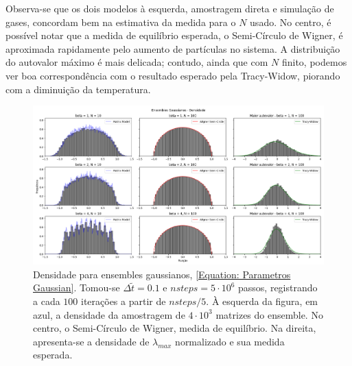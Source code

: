 \documentclass[12pt]{report}
\begin{document}
Observa-se que os dois modelos à esquerda, amostragem direta e simulação de gases, concordam bem na estimativa da medida para o $N$ usado. No centro, é possível notar que a medida de equilíbrio esperada, o Semi-Círculo de Wigner, é aproximada rapidamente pelo aumento de partículas no sistema. A distribuição do autovalor máximo é mais delicada; contudo, ainda que com $N$ finito, podemos ver boa correspondência com o resultado esperado pela Tracy-Widow, piorando com a diminuição da temperatura.
\begin{figure}[ht!]
	\centering
	\includegraphics[width=\textwidth]{Assets/validationGaussianTracy.png}
	\caption{Densidade para ensembles gaussianos, \eqref{Equation: Parametros Gaussian}. Tomou-se $\Delta \tilde{t} = 0.1$ e $nsteps = 5\cdot10^6$ passos, registrando a cada $100$ iterações a partir de $nsteps/5$. À esquerda da figura, em azul, a densidade da amostragem de $4\cdot10^3$ matrizes do ensemble. No centro, o Semi-Círculo de Wigner, medida de equilíbrio. Na direita, apresenta-se a densidade de $\lambda_{max}$ normalizado e sua medida esperada.}
	\label{Figura: Gaussian}
\end{figure}
\end{document}
